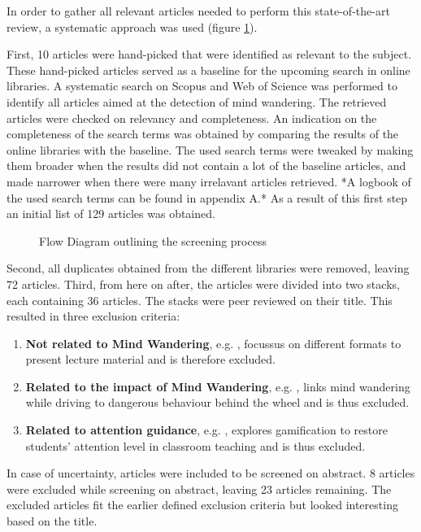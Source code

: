 

In order to gather all relevant articles needed to perform this state-of-the-art review, a systematic approach was used (figure \ref{fig:prisma}).

First, 10 articles were hand-picked that were identified as relevant to the subject. These hand-picked articles served as a baseline for the upcoming search in online libraries.
A systematic search on Scopus and Web of Science was performed to identify all articles aimed at the detection of mind wandering. The retrieved articles were checked on relevancy and completeness.
An indication on the completeness of the search terms was obtained by comparing the results of the online libraries with the baseline. 
The used search terms were tweaked by making them broader when the results did not contain a lot of the baseline articles, and made narrower when there were many irrelavant articles retrieved.
*A logbook of the used search terms can be found in appendix A.*
As a result of this first step an initial list of 129 articles was obtained.

\begin{figure}
  \resizebox{\columnwidth}{!}{}
\caption{Flow Diagram outlining the screening process}
\label{fig:prisma}
\end{figure}

Second, all duplicates obtained from the different libraries were removed, leaving 72 articles.
Third, from here on after, the articles were divided into two stacks, each containing 36 articles. 
The stacks were peer reviewed on their title. This resulted in three exclusion criteria:
\begin{enumerate}
    \item \textbf{Not related to Mind Wandering}, e.g. \cite{ISI:000432512400017}, focussus on different formats to present lecture material and is therefore excluded.
    \item \textbf{Related to the impact of Mind Wandering}, e.g. \cite{Albert2018LinkingDrivers}, links mind wandering while driving to dangerous behaviour behind the wheel and is thus excluded.
    \item \textbf{Related to attention guidance}, e.g. \cite{Xiao2018ClassroomMechanism}, explores gamification to restore students' attention level in classroom teaching and is thus excluded.
  \end{enumerate}
In case of uncertainty, articles were included to be screened on abstract.
8 articles were excluded while screening on abstract, leaving 23 articles remaining. 
The excluded articles fit the earlier defined exclusion criteria but looked interesting based on the title.

